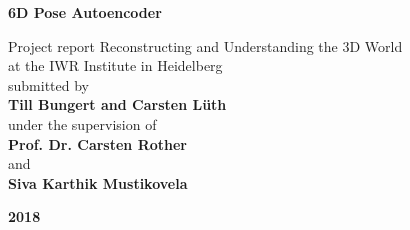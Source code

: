 \documentclass[10pt,a4paper]{article}
\begin{document}
\pagestyle{empty}

\begin{titlepage}


    \begin{center} 
        {\Large\textbf{ 
                6D Pose Autoencoder
        }}
        \vspace{1cm}

        Project report Reconstructing and Understanding the 3D World\\
        at the IWR Institute in Heidelberg\\
        \vspace{5cm}
        submitted by\\
        \vspace{0.5cm}
        {\large\textbf{Till Bungert and Carsten Lüth}\\}
        \vspace{5cm}
        under the supervision of \\
        \vspace{0.5cm}
        {\large\textbf{Prof. Dr. Carsten Rother}\\}
        and\\
        {\large\textbf{Siva Karthik Mustikovela}\\}


        \vspace{3cm}
        {\Large\textbf{2018}}




    \end{center}
\end{titlepage}


\tableofcontents

\newpage

\pagestyle{headings}
\end{document}
